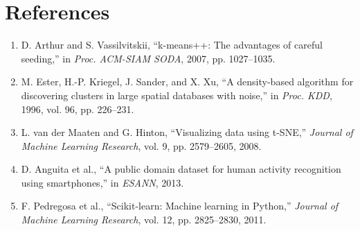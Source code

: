 \documentclass[12pt,a4paper]{article}
\begin{document}
\section{References}
\begin{enumerate}
    \item D. Arthur and S. Vassilvitskii, ``k-means++: The advantages of careful seeding,'' in \textit{Proc. ACM-SIAM SODA}, 2007, pp. 1027--1035.
    \item M. Ester, H.-P. Kriegel, J. Sander, and X. Xu, ``A density-based algorithm for discovering clusters in large spatial databases with noise,'' in \textit{Proc. KDD}, 1996, vol. 96, pp. 226--231.
    \item L. van der Maaten and G. Hinton, ``Visualizing data using t-SNE,'' \textit{Journal of Machine Learning Research}, vol. 9, pp. 2579--2605, 2008.
    \item D. Anguita et al., ``A public domain dataset for human activity recognition using smartphones,'' in \textit{ESANN}, 2013.
    \item F. Pedregosa et al., ``Scikit-learn: Machine learning in Python,'' \textit{Journal of Machine Learning Research}, vol. 12, pp. 2825--2830, 2011.
\end{enumerate}
\end{document}
